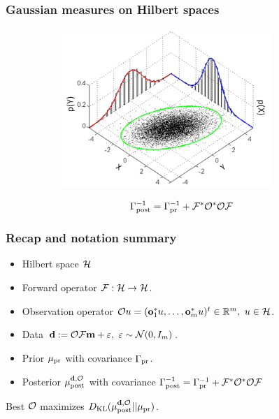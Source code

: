\documentclass{beamer}
\begin{document}
\begin{frame}
\frametitle{Gaussian measures on Hilbert spaces}
\begin{figure}
   \includegraphics[width=10cm,height=6cm]{MultivariateNormal.png}
\end{figure}

\begin{align*}
  \Gamma_{\textup{post}}^{-1} = \Gamma_{\textup{pr}}^{-1} + \mathcal{F}^* \mathcal{O}^*\mathcal{O} \mathcal{F}
\end{align*}

\end{frame}

\begin{frame}
\frametitle{Recap and notation summary}

\begin{itemize}
\item Hilbert space \(\mathcal{H}\) 
\item Forward operator \(\mathcal{F}: \mathcal{H} \to \mathcal{H}\).
\item Observation operator \(\mathcal{O} u = (\mathbf{o}_1^*u, \dots, \mathbf{o}_m^*u )^t \in \mathbb{R}^m,\ u \in \mathcal{H}\).
\item Data \(\mathbf{d} := \mathcal{O} \mathcal{F} \mathbf{m} + \varepsilon,\ \varepsilon \sim \mathcal{N}(0,I_m)\).
\item Prior \(\mu_{\textup{pr}}\) with covariance \(\Gamma_{\textup{pr}}\).
\item Posterior \(\mu_{\textup{post}}^{\mathbf{d}, \mathcal{O}}\) with covariance \(\Gamma_{\textup{post}}^{-1} = \Gamma_{\textup{pr}}^{-1} + \mathcal{F}^* \mathcal{O}^*\mathcal{O} \mathcal{F}\)
\end{itemize}
\end{frame}

\begin{frame}
  Best \(\mathcal{O}\) maximizes \(D_{\text{KL}} (\mu_{\textup{post}}^{\mathbf{d}, \mathcal{O}} || \mu_{\textup{pr}} )\).
\end{frame}
\end{document}
